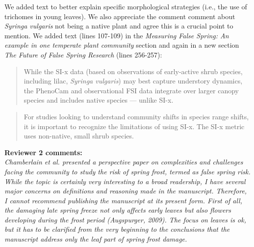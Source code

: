 \documentclass[11pt,a4paper]{article}
\begin{document}
We added text to better explain specific morphological strategies (i.e., the use of trichomes in young leaves). We also appreciate the comment comment about \textit{Syringa vulgaris} not being a native plant and agree this is a crucial point to mention. We added text (lines 107-109) in the \textit{Measuring False Spring: An example in one temperate plant community} section and again in a new section \textit{The Future of False Spring Research} (lines 256-257):\\

\begin{quotation}
While the SI-x data (based on observations of early-active shrub species, including lilac, \emph{Syringa vulgaris}) may best capture understory dynamics, the PhenoCam and observational FSI data integrate over larger canopy species and includes native species --- unlike SI-x.
\end{quotation}

\begin{quotation}
For studies looking to understand community shifts in species range shifts, it is important to recognize the limitations of using SI-x. The SI-x metric uses non-native, small shrub species.
\end{quotation}


\textbf {Reviewer 2 comments:} \\

\textit{Chamberlain et al. presented a perspective paper on complexities and challenges facing the community to study the risk of spring frost, termed as false spring risk. While the topic is certainly very interesting to a broad readership, I have several major concerns on definitions and reasoning made in the manuscript. Therefore, I cannot recommend publishing the manuscript at its present form. First of all, the damaging late spring freeze not only affects early leaves but also flowers developing during the frost period (Augspurger, 2009). The focus on leaves is ok, but it has to be clarified from the very beginning to the conclusions that the manuscript address only the leaf part of spring frost damage.}\\
\end{document}
